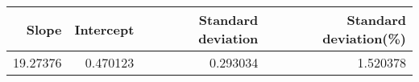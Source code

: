 \begin{table}[H]
\centering
\label{slope}
\begin{tabular}{rrrr}
\toprule
   Slope &  Intercept &  Standard deviation &  Standard deviation(\%) \\
\midrule
19.27376 &   0.470123 &            0.293034 &               1.520378 \\
\bottomrule
\end{tabular}
\end{table}
